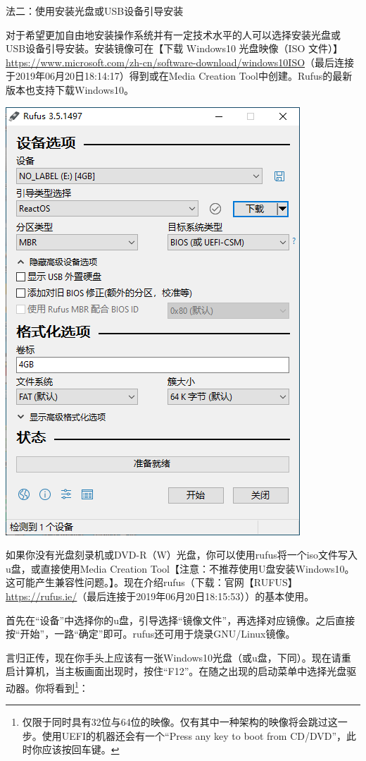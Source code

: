 \documentclass{book}
\begin{document}
法二：使用安装光盘或USB设备引导安装\par
对于希望更加自由地安装操作系统并有一定技术水平的人可以选择安装光盘或USB设备引导安装。安装镜像可在【下载 Windows10 光盘映像（ISO 文件）】\url{https://www.microsoft.com/zh-cn/software-download/windows10ISO}（最后连接于2019年06月20日18:14:17）得到或在Media Creation Tool中创建。Rufus的最新版本也支持下载Windows10。
\begin{center}
	\includegraphics[scale=0.6]{pic/rufus}	
\end{center}
如果你没有光盘刻录机或DVD-R（W）光盘，你可以使用rufus将一个iso文件写入u盘，或直接使用Media Creation Tool【注意：不推荐使用U盘安装Windows10。这可能产生兼容性问题。】。现在介绍rufus（下载：官网【RUFUS】\url{https://rufus.ie/}（最后连接于2019年06月20日18:15:53））的基本使用。\par
首先在“设备”中选择你的u盘，引导选择“镜像文件”，再选择对应镜像。之后直接按“开始”，一路“确定”即可。rufus还可用于烧录GNU/Linux镜像。\par
言归正传，现在你手头上应该有一张Windows10光盘（或u盘，下同）。现在请重启计算机，当主板画面出现时，按住“F12”。在随之出现的启动菜单中选择光盘驱动器。你将看到\footnote{仅限于同时具有32位与64位的映像。仅有其中一种架构的映像将会跳过这一步。使用UEFI的机器还会有一个“Press any key to boot from CD/DVD”，此时你应该按回车键。}：
\end{document}
